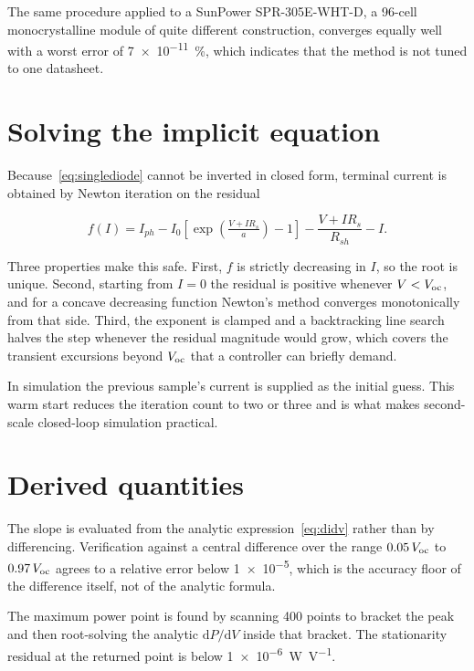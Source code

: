 The same procedure applied to a SunPower SPR-305E-WHT-D, a 96-cell
monocrystalline module of quite different construction, converges equally well
with a worst error of \SI{7e-11}{\percent}, which indicates that the method is
not tuned to one datasheet.

\section{Solving the implicit equation}
\label{sec:solver}

Because~\eqref{eq:singlediode} cannot be inverted in closed form, terminal
current is obtained by Newton iteration on the residual

\begin{equation}
f(I) = I_{ph} - I_0\left[\exp\!\left(\tfrac{V + I R_s}{a}\right) - 1\right] - \frac{V + I R_s}{R_{sh}} - I .
\end{equation}

Three properties make this safe. First, $f$ is strictly decreasing in $I$, so
the root is unique. Second, starting from $I = 0$ the residual is positive
whenever $V < V_{\mathrm{oc}}$, and for a concave decreasing function Newton's method
converges monotonically from that side. Third, the exponent is clamped and a
backtracking line search halves the step whenever the residual magnitude would
grow, which covers the transient excursions beyond $V_{\mathrm{oc}}$ that a controller can
briefly demand.

In simulation the previous sample's current is supplied as the initial guess.
This warm start reduces the iteration count to two or three and is what makes
second-scale closed-loop simulation practical.

\section{Derived quantities}

The slope is evaluated from the analytic expression~\eqref{eq:didv} rather than
by differencing. Verification against a central difference over the range
$0.05\,V_{\mathrm{oc}}$ to $0.97\,V_{\mathrm{oc}}$ agrees to a relative error below \num{1e-5}, which
is the accuracy floor of the difference itself, not of the analytic formula.

The maximum power point is found by scanning \num{400} points to bracket the
peak and then root-solving the analytic $\mathrm{d}P/\mathrm{d}V$ inside that
bracket. The stationarity residual at the returned point is below
\SI{1e-6}{\watt\per\volt}.

